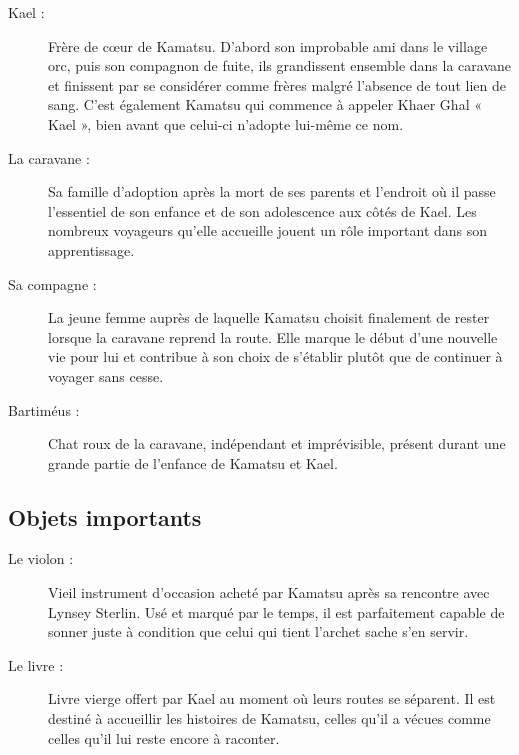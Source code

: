 \begin{description}
    \item[Kael :] Frère de cœur de Kamatsu. D'abord son improbable ami dans le
    village orc, puis son compagnon de fuite, ils grandissent ensemble dans la
    caravane et finissent par se considérer comme frères malgré l'absence de
    tout lien de sang. C'est également Kamatsu qui commence à appeler Khaer
    Ghal « Kael », bien avant que celui-ci n'adopte lui-même ce nom.

    \item[La caravane :] Sa famille d'adoption après la mort de ses parents et
    l'endroit où il passe l'essentiel de son enfance et de son adolescence
    aux côtés de Kael. Les nombreux voyageurs qu'elle accueille jouent un rôle
    important dans son apprentissage.

    \item[Sa compagne :] La jeune femme auprès de laquelle Kamatsu choisit
    finalement de rester lorsque la caravane reprend la route. Elle marque le
    début d'une nouvelle vie pour lui et contribue à son choix de s'établir
    plutôt que de continuer à voyager sans cesse.

    \item[Bartiméus :] Chat roux de la caravane, indépendant et imprévisible,
    présent durant une grande partie de l'enfance de Kamatsu et Kael.
\end{description}

\subsection*{Objets importants}

\begin{description}
    \item[Le violon :] Vieil instrument d'occasion acheté par Kamatsu après sa
    rencontre avec Lynsey Sterlin. Usé et marqué par le temps, il est
    parfaitement capable de sonner juste à condition que celui qui tient
    l'archet sache s'en servir.

    \item[Le livre :] Livre vierge offert par Kael au moment où leurs routes
    se séparent. Il est destiné à accueillir les histoires de Kamatsu, celles
    qu'il a vécues comme celles qu'il lui reste encore à raconter.
\end{description}